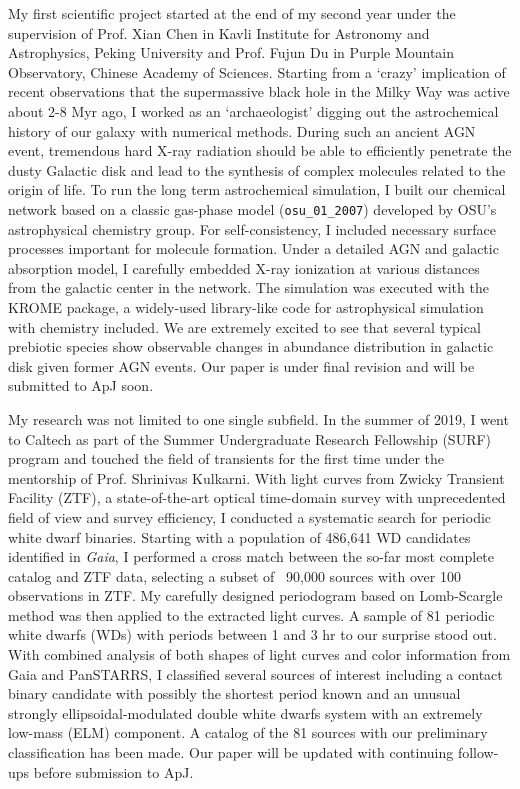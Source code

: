\documentclass[11pt, a4paper]{awesome-cv} %
\begin{document}
\begin{cvletter}
My first scientific project started at the end of my second year under the supervision of Prof. Xian Chen in Kavli Institute for Astronomy and Astrophysics, Peking University and Prof. Fujun Du in Purple Mountain Observatory, Chinese Academy of Sciences. Starting from a `crazy' implication of recent observations that the supermassive black hole in the Milky Way was active about 2-8 Myr ago, I worked as an `archaeologist' digging out the astrochemical history of our galaxy with numerical methods. During such an ancient AGN event, tremendous hard X-ray radiation should be able to efficiently penetrate the dusty Galactic disk and lead to the synthesis of complex molecules related to the origin of life. To run the long term astrochemical simulation, I built our chemical network based on a classic gas-phase model (\texttt{osu\_01\_2007}) developed by OSU's astrophysical chemistry group. For self-consistency, I included necessary surface processes important for molecule formation. Under a detailed AGN and galactic absorption model, I carefully embedded X-ray ionization at various distances from the galactic center in the network. The simulation was executed with the KROME package, a widely-used library-like code for astrophysical simulation with chemistry included. We are extremely excited to see that several typical prebiotic species show observable changes in abundance distribution in galactic disk given former AGN events. Our paper is under final revision and will be submitted to ApJ soon.

My research was not limited to one single subfield. In the summer of 2019, I went to Caltech as part of the Summer Undergraduate Research Fellowship (SURF) program and touched the field of transients for the first time under the mentorship of Prof. Shrinivas Kulkarni. With light curves from Zwicky Transient Facility (ZTF), a state-of-the-art optical time-domain survey with unprecedented field of view and survey efficiency, I conducted a systematic search for periodic white dwarf binaries. Starting with a population of 486,641 WD candidates identified in \textit{Gaia}, I performed a cross match between the so-far most complete catalog and ZTF data, selecting a subset of ~90,000 sources with over 100 observations in ZTF. My carefully designed periodogram based on Lomb-Scargle method was then applied to the extracted light curves. A sample of 81 periodic white dwarfs (WDs) with periods between 1 and 3 hr to our surprise stood out. With combined analysis of both shapes of light curves and color information from Gaia and PanSTARRS, I classified several sources of interest including a contact binary candidate with possibly the shortest period known and an unusual strongly ellipsoidal-modulated double white dwarfs system with an extremely low-mass (ELM) component. A catalog of the 81 sources with our preliminary classification has been made. Our paper will be updated with continuing follow-ups before submission to ApJ.


\end{cvletter}
\end{document}
